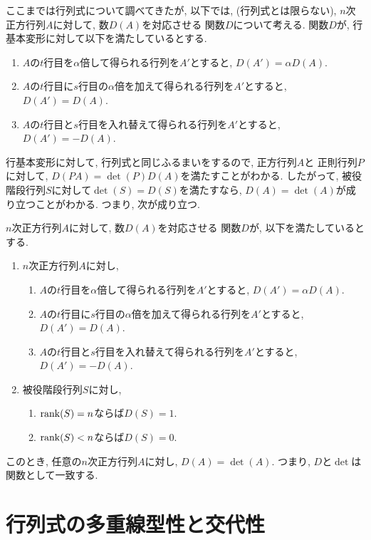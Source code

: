 ここまでは行列式について調べてきたが,
以下では, (行列式とは限らない),
$n$次正方行列$A$に対して,
数$D(A)$を対応させる
関数$D$について考える.
関数$D$が,
行基本変形に対して以下を満たしているとする.
\begin{enumerate}
\item 
  $A$の$t$行目を$\alpha$倍して得られる行列を$A'$とすると,
  $D(A')=\alpha D(A)$.
\item 
  $A$の$t$行目に$s$行目の$\alpha$倍を加えて得られる行列を$A'$とすると,
  $D(A')=D(A)$.
\item 
  $A$の$t$行目と$s$行目を入れ替えて得られる行列を$A'$とすると,
  $D(A')=-D(A)$.
\end{enumerate}
行基本変形に対して, 行列式と同じふるまいをするので,
正方行列$A$と
正則行列$P$に対して,
$D(PA)=\det(P)D(A)$を満たすことがわかる.
したがって, 被役階段行列$S$に対して$\det(S)=D(S)$を満たすなら,
$D(A)=\det(A)$が成り立つことがわかる.
つまり, 次が成り立つ.
\begin{prop}
  \label{det:rowtransdef}
$n$次正方行列$A$に対して,
数$D(A)$を対応させる
関数$D$が,
以下を満たしているとする.
\begin{enumerate}
  \item $n$次正方行列$A$に対し,
  \begin{enumerate}
  \item 
    $A$の$t$行目を$\alpha$倍して得られる行列を$A'$とすると,
    $D(A')=\alpha D(A)$.
  \item 
    $A$の$t$行目に$s$行目の$\alpha$倍を加えて得られる行列を$A'$とすると,
    $D(A')=D(A)$.
  \item 
    $A$の$t$行目と$s$行目を入れ替えて得られる行列を$A'$とすると,
    $D(A')=-D(A)$.
  \end{enumerate}
  \item 被役階段行列$S$に対し,
  \begin{enumerate}
  \item $\operatorname{rank}(S)=n$ならば$D(S)=1$.
  \item $\operatorname{rank}(S)<n$ならば$D(S)=0$.
  \end{enumerate}
\end{enumerate}
このとき, 任意の$n$次正方行列$A$に対し,
$D(A)=\det(A)$.
つまり, $D$と$\det$は関数として一致する.
\end{prop}

\section{行列式の多重線型性と交代性}

